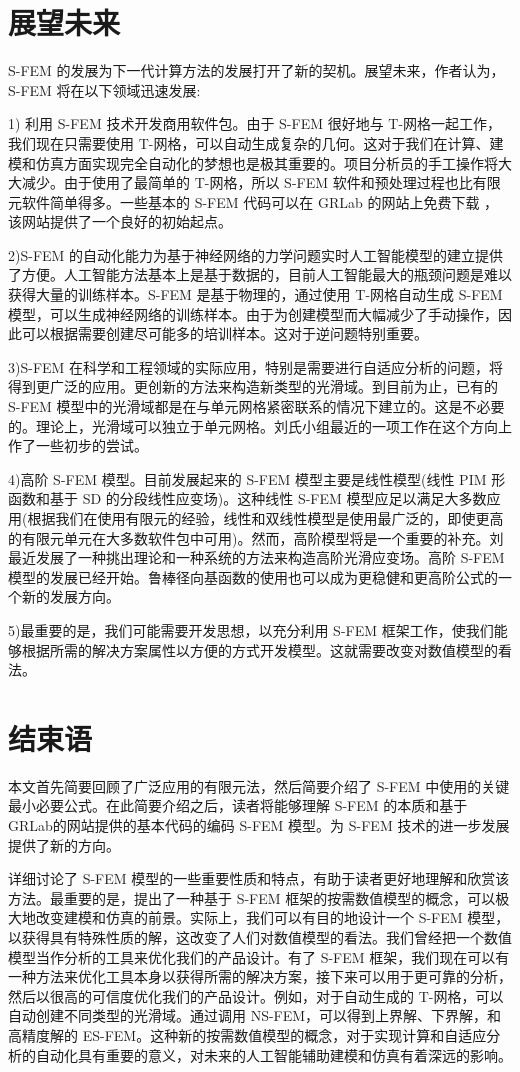 \documentclass[12pt,a4paper]{article}
\begin{document}
\section{展望未来}
S-FEM 的发展为下一代计算方法的发展打开了新的契机。展望未来，作者认为，S-FEM 将在以下领域迅速发展:

1) 利用 S-FEM 技术开发商用软件包。由于 S-FEM 很好地与 T-网格一起工作，我们现在只需要使用 T-网格，可以自动生成复杂的几何。这对于我们在计算、建模和仿真方面实现完全自动化的梦想也是极其重要的。项目分析员的手工操作将大大减少。由于使用了最简单的 T-网格，所以 S-FEM 软件和预处理过程也比有限元软件简单得多。一些基本的 S-FEM 代码可以在 GRLab 的网站上免费下载
，该网站提供了一个良好的初始起点。

2)S-FEM 的自动化能力为基于神经网络的力学问题实时人工智能模型的建立提供了方便。人工智能方法基本上是基于数据的，目前人工智能最大的瓶颈问题是难以获得大量的训练样本。S-FEM 是基于物理的，通过使用 T-网格自动生成 S-FEM 模型，可以生成神经网络的训练样本。由于为创建模型而大幅减少了手动操作，因此可以根据需要创建尽可能多的培训样本。这对于逆问题特别重要。

3)S-FEM 在科学和工程领域的实际应用，特别是需要进行自适应分析的问题，将得到更广泛的应用。更创新的方法来构造新类型的光滑域。到目前为止，已有的 S-FEM 模型中的光滑域都是在与单元网格紧密联系的情况下建立的。这是不必要的。理论上，光滑域可以独立于单元网格。刘氏小组最近的一项工作在这个方向上作了一些初步的尝试。

4)高阶 S-FEM 模型。目前发展起来的 S-FEM 模型主要是线性模型(线性 PIM 形函数和基于 SD 的分段线性应变场)。这种线性 S-FEM 模型应足以满足大多数应用(根据我们在使用有限元的经验，线性和双线性模型是使用最广泛的，即使更高
的有限元单元在大多数软件包中可用)。然而，高阶模型将是一个重要的补充。刘最近发展了一种挑出理论和一种系统的方法来构造高阶光滑应变场。高阶 S-FEM 模型的发展已经开始。鲁棒径向基函数的使用也可以成为更稳健和更高阶公式的一个新的发展方向。

5)最重要的是，我们可能需要开发思想，以充分利用 S-FEM 框架工作，使我们能够根据所需的解决方案属性以方便的方式开发模型。这就需要改变对数值模型的看法。

\section{结束语}
本文首先简要回顾了广泛应用的有限元法，然后简要介绍了 S-FEM 中使用的关键最小必要公式。在此简要介绍之后，读者将能够理解 S-FEM 的本质和基于 GRLab的网站提供的基本代码的编码 S-FEM 模型。为 S-FEM 技术的进一步发展提供了新的方向。

详细讨论了 S-FEM 模型的一些重要性质和特点，有助于读者更好地理解和欣赏该方法。最重要的是，提出了一种基于 S-FEM 框架的按需数值模型的概念，可以极大地改变建模和仿真的前景。实际上，我们可以有目的地设计一个 S-FEM 模型，以获得具有特殊性质的解，这改变了人们对数值模型的看法。我们曾经把一个数值模型当作分析的工具来优化我们的产品设计。有了 S-FEM 框架，我们现在可以有一种方法来优化工具本身以获得所需的解决方案，接下来可以用于更可靠的分析，然后以很高的可信度优化我们的产品设计。例如，对于自动生成的 T-网格，可以自动创建不同类型的光滑域。通过调用 NS-FEM，可以得到上界解、下界解，和高精度解的 ES-FEM。这种新的按需数值模型的概念，对于实现计算和自适应分析的自动化具有重要的意义，对未来的人工智能辅助建模和仿真有着深远的影响。



%
%
\end{document}
